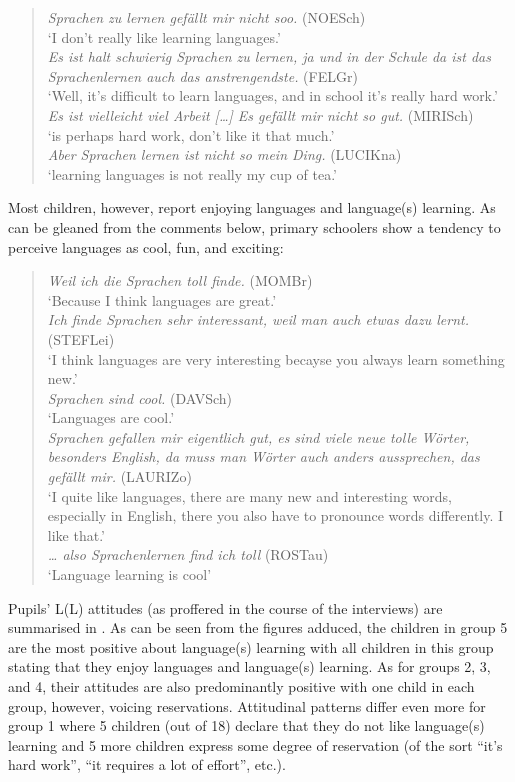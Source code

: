 \documentclass[output=paper]{../langscibook}
\begin{document}
\begin{quote}\sloppy
\textit{Sprachen zu lernen gefällt mir nicht soo.} (NOESch)\\
`I don’t really like learning languages.'\medskip\\
\textit{Es ist halt schwierig Sprachen zu lernen, ja und in der Schule da ist das Sprachenlernen auch das anstrengendste.} (FELGr)\\
`Well, it’s difficult to learn languages, and in school it’s really hard work.'\medskip\\
\textit{Es ist vielleicht viel Arbeit […] Es gefällt mir nicht so gut.} (MIRISch)\\
`is perhaps hard work, don’t like it that much.'\medskip\\
\textit{Aber Sprachen lernen ist nicht so mein Ding.} (LUCIKna)\\
`learning languages is not really my cup of tea.'
\end{quote}

Most children, however, report enjoying languages and language(s) learning. As can be gleaned from the comments below, primary schoolers show a tendency to perceive languages as cool, fun, and exciting:

\begin{quote}
\textit{Weil ich die Sprachen toll finde.} (MOMBr)\\
`Because I think languages are great.'\medskip\\
\textit{Ich finde Sprachen sehr interessant, weil man auch etwas dazu lernt.} (STEFLei)\\
`I think languages are very interesting becayse you always learn something new.'\medskip\\
\textit{Sprachen sind cool.} (DAVSch)\\
`Languages are cool.'\medskip\\
\textit{Sprachen gefallen mir eigentlich gut, es sind viele neue tolle Wörter, besonders English, da muss man Wörter auch anders aussprechen, das gefällt mir.} (\mbox{LAURIZo})\\
`I quite like languages, there are many new and interesting words, especially in English, there you also have to pronounce words differently. I like that.'\medskip\\
\textit{… also Sprachenlernen find ich toll} (ROSTau)\\
`Language learning is cool'
\end{quote}

Pupils’ L(L) attitudes (as proffered in the course of the interviews) are summarised in . As can be seen from the figures adduced, the children in group 5 are the most positive about language(s) learning with all children in this group stating that they enjoy languages and language(s) learning. As for groups 2, 3, and 4, their attitudes are also predominantly positive with one child in each group, however, voicing reservations. Attitudinal patterns differ even more for group 1 where 5 children (out of 18) declare that they do not like language(s) learning and 5 more children express some degree of reservation (of the sort ``it’s hard work'', ``it requires a lot of effort'', etc.).
\end{document}
